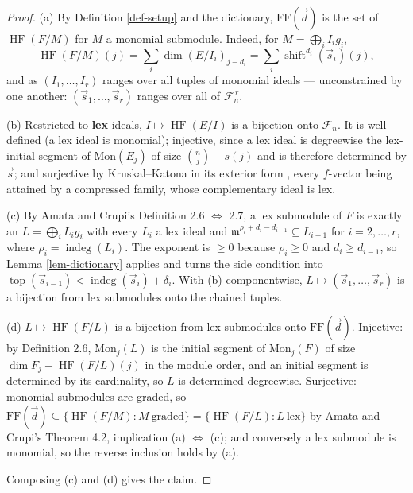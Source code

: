 \documentclass[11pt, a4paper, abstract=yes]{scrartcl}
\theoremstyle{definition}
\theoremstyle{remark}
\theoremstyle{plain}
\newcommand{\shift}{\operatorname{shift}}
\newcommand{\indeg}{\operatorname{indeg}}
\newcommand{\tp}{\operatorname{top}}
\newcommand{\HF}{\operatorname{HF}}
\begin{document}
\begin{proof}
(a) By Definition \ref{def-setup} and the dictionary, \(\mathrm{FF}(\vec d)\) is the set of \(\HF(F/M)\)
for \(M\) a monomial submodule. Indeed, for \(M=\bigoplus_iI_ig_i\),
\[
  \HF(F/M)(j)=\sum_i\dim(E/I_i)_{j-d_i}=\sum_i\shift^{d_i}(\vec s_i)(j) ,
\]
and as \((I_1,\dots,I_r)\) ranges over all tuples of monomial ideals --- unconstrained by one
another: \((\vec s_1,\dots,\vec s_r)\) ranges over all of \(\mathcal F_n^{\,r}\).

(b) Restricted to \textbf{lex} ideals, \(I\mapsto\HF(E/I)\) is a bijection onto \(\mathcal F_n\). It is well
defined (a lex ideal is monomial); injective, since a lex ideal is degreewise the lex-initial segment
of \(\mathrm{Mon}(E_j)\) of size \(\binom nj-s(j)\) and is therefore determined by \(\vec s\); and
surjective by Kruskal--Katona in its exterior form \textcite[Theorem 4.1]{AramovaHerzogHibi1997}, every \(f\)-vector being attained by a compressed
family, whose complementary ideal is lex.

(c) By Amata and Crupi's Definition 2.6 \(\Leftrightarrow\) 2.7, a lex submodule of \(F\) is exactly
an \(L=\bigoplus_iL_ig_i\) with every \(L_i\) a lex ideal and
\(\mathfrak m^{\rho_i+d_i-d_{i-1}}\subseteq L_{i-1}\) for \(i=2,\dots,r\), where
\(\rho_i=\indeg(L_i)\). The exponent is \(\ge0\) because \(\rho_i\ge0\) and \(d_i\ge d_{i-1}\), so
Lemma \ref{lem-dictionary} applies and turns the side condition into
\(\tp(\vec s_{i-1})<\indeg(\vec s_i)+\delta_i\). With (b) componentwise, \(L\mapsto(\vec s_1,\dots,\vec s_r)\) is a
bijection from lex submodules onto the chained tuples.

(d) \(L\mapsto\HF(F/L)\) is a bijection from lex submodules onto \(\mathrm{FF}(\vec d)\). Injective: by
Definition 2.6, \(\mathrm{Mon}_j(L)\) is the initial segment of \(\mathrm{Mon}_j(F)\) of size
\(\dim F_j-\HF(F/L)(j)\) in the module order, and an initial segment is determined by its
cardinality, so \(L\) is determined degreewise. Surjective: monomial submodules are graded, so
\(\mathrm{FF}(\vec d)\subseteq\lbrace\HF(F/M):M\ \text{graded}\rbrace=\lbrace\HF(F/L):L\ \text{lex}\rbrace\)
by Amata and Crupi's Theorem 4.2, implication (a) \(\Leftrightarrow\) (c); and conversely a lex
submodule is monomial, so the reverse inclusion holds by (a).

Composing (c) and (d) gives the claim.
\end{proof}
\end{document}

